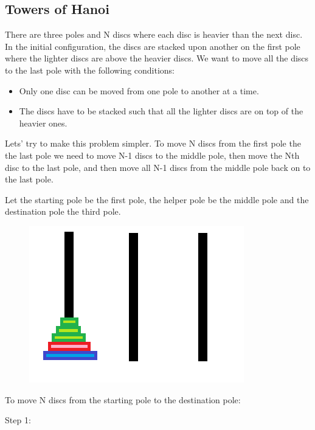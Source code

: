 \documentclass[11pt,oneside]{book}
\makeatletter
\def\maxwidth#1{\ifdim\Gin@nat@width>#1 #1\else\Gin@nat@width\fi}
\makeatother
\begin{document}
\subsection{Towers of Hanoi}

There are three poles and N discs where each disc is heavier than the next disc. In the initial configuration, the discs are stacked upon another on the first pole where the lighter discs are above the heavier discs. We want to move all the discs to the last pole with the following conditions:

\begin{itemize}
\item Only one disc can be moved from one pole to another at a time.
\item The discs have to be stacked such that all the lighter discs are on top of the heavier ones.
\end{itemize}

Lets' try to make this problem simpler. To move N discs from the first pole the the last pole we need to move N-1 discs to the middle pole, then move the Nth disc to the last pole, and then move all N-1 discs from the middle pole back on to the last pole.

Let the starting pole be the first pole, the helper pole be the middle pole and the destination pole the third pole.

\vspace{5px}\begin{figure}[H]\centering
        \includegraphics[width=0.66\maxwidth{\textwidth}]{hanoi.png}
        \end{figure}

To move N discs from the starting pole to the destination pole:

Step 1:
\end{document}
